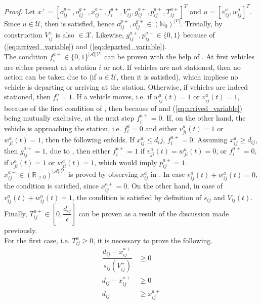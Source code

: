 \textit{Proof}. Let $x^+ = [o_{ij}^{p+}, o_{ij}^{g+}, x_{ij}^{a+}, f^{a+}_{i}, V_{ij}^{+}, g^{a+}_{ij}, p^{a+}_{ij}, T^{a+}_{ij}]^T$ and $u = [v^{a}_{ij}, w^{a}_{ij}]^T$. Since $u \in \mathcal{U}$, then  is satisfied, hence $o_{ij}^{p+}, o_{ij}^{g+} \in (\mathbb{N}_0)^{|\mathcal{V}|}$. Trivially, by construction $V_{ij}^{+}$ is also $\in \mathcal{X}$. Likewise, $g^{a+}_{ij}, p^{a+}_{ij} \in \{0,1\}$ because of (\ref{eq:arrived_variable}) and (\ref{eq:departed_variable}). \\
The condition $f^{a+}_{i} \in \{0,1\}^{|\mathcal{A}||\mathcal{V}|}$ can be proven with the help of . At first vehicles are either present at a station $i$ or not. If vehicles are not stationed, then no action can be taken due to  (if $u \in \mathcal{U}$, then it is satisfied), which impliese no vehicle is departing or arriving at the station. Otherwise, if vehicles are indeed stationed, then $f^{a}_{i} = 1$. If a vehicle moves, i.e. if $w^a_{ij}(t) = 1$ or $v^a_{ij}(t) = 1$, because of the first condition of , then because of  and (\ref{eq:arrived_variable}) being mutually exclusive, at the next step $f^{a+}_{i} =0$. If, on the other hand, the vehicle is approaching the station, i.e. $f^{a}_{i} =0$ and 
either $v^a_{ji}(t) = 1$ or $w^a_{ji}(t) = 1$, then the following enfolds. If $x_{ij}^{a} \leq d_ij$, $f^{a+}_{i} =0$. Assuming $x_{ij}^{a} \ge d_{ij}$, then $g^{a+}_{ij} = 1$, due to , then either $f^{a+}_{i} =1$ if  $v^a_{ji}(t) = w^a_{ji}(t) = 0$, or $f^{a+}_{i} =0$, if $v^a_{ji}(t) = 1$ or $w^a_{ji}(t) = 1$, which would imply $p^{a+}_{ij}=1$. \\
$x_{ij}^{a+}\in (\mathbb{R}_{\ge 0})^{|\mathcal{A}||\mathcal{V}|}$ is proved by observing $x_{ij}^a$ in  . In case $v^a_{ij}(t) + w^a_{ij}(t)= 0$, the condition is satisfied, since  $x_{ij}^{a+} = 0$.  On the other hand, in case of $v^a_{ij}(t) + w^a_{ij}(t)= 1$, the condition is satisfied by definition of $s_{ij}$ and $V_{ij}(t)$. \\
Finally, $T_{ij}^{a+} \in [0, \dfrac{d_{ij}}{\epsilon}]$ can be proven as a result of the discussion made previously. \\
For the first case, i.e. $T_{ij}^{a} \ge 0$, it is necessary to prove the following. 
\begin{align*}
	\dfrac{d_{ij} - x_{ij}^{a+}}{s_{ij}(V^+_{ij})} &\ge 0\\
	d_{ij} - x_{ij}^{a+} &\ge 0\\
	d_{ij} &\ge x_{ij}^{a+}\\
\end{align*}
